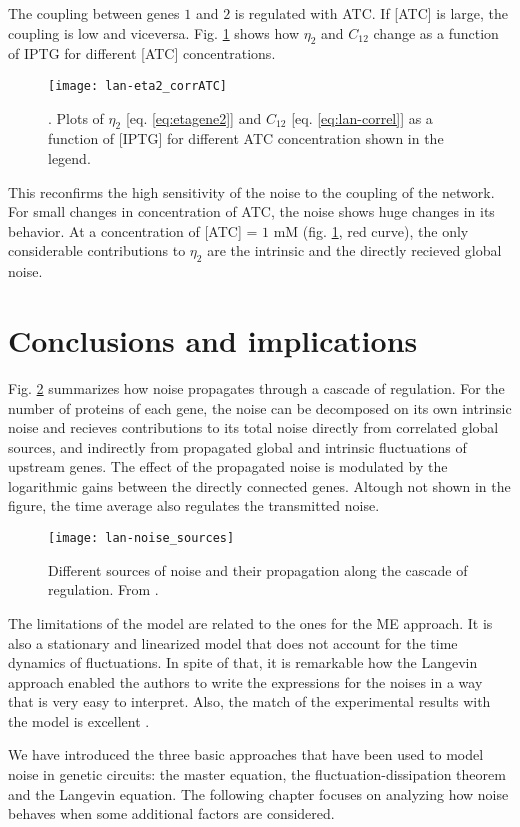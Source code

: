 The coupling between genes $1$ and $2$ is regulated with ATC. If [ATC] is large, the coupling is low and viceversa. Fig. \ref{fig:lan-eta2_corrATC} shows how $\eta_2$ and $C_{12}$ change as a function of IPTG for different [ATC] concentrations.

\begin{figure}[H]
  \centering
  \texttt{[image: lan-eta2\_corrATC]}
  \caption[Noise in gene $2$ for varying ATC concentrations]{\label{fig:lan-eta2_corrATC}. Plots of $\eta_2$ [eq. \eqref{eq:etagene2}] and $C_{12}$ [eq. \eqref{eq:lan-correl}] as a function of [IPTG] for different ATC concentration shown in the legend.}
\end{figure}

This reconfirms the high sensitivity of the noise to the coupling of the network. For small changes in concentration of ATC, the noise shows huge changes in its behavior. At a concentration of [ATC] = $1$ mM (fig. \ref{fig:lan-eta2_corrATC}, red curve), the only considerable contributions to $\eta_2$ are the intrinsic and the directly recieved global noise.

\section{Conclusions and implications}

Fig. \ref{fig:lan-noise_sources} summarizes how noise propagates through a cascade of regulation. For the number of proteins of each gene, the noise can be decomposed on its own intrinsic noise and recieves contributions to its total noise directly from correlated global sources, and indirectly from propagated global and intrinsic fluctuations of upstream genes. The effect of the propagated noise is modulated by the logarithmic gains between the directly connected genes. Altough not shown in the figure, the time average also regulates the transmitted noise.

\begin{figure}[H]
  \centering
  \texttt{[image: lan-noise\_sources]}
  \caption[Propagation of noise through a cascade]{\label{fig:lan-noise_sources} Different sources of noise and their propagation along the cascade of regulation. From \cite{pedraza05}.}
\end{figure}

The limitations of the model are related to the ones for the ME approach. It is also a stationary and linearized model that does not account for the time dynamics of fluctuations. In spite of that, it is remarkable how the Langevin approach enabled the authors to write the expressions for the noises in a way that is very easy to interpret. Also, the match of the experimental results with the model is excellent \cite{pedraza05} \cite{pedraza06}.

We have introduced the three basic approaches that have been used to model noise in genetic circuits: the master equation, the fluctuation-dissipation theorem and the Langevin equation. The following chapter focuses on analyzing how noise behaves when some additional factors are considered.
